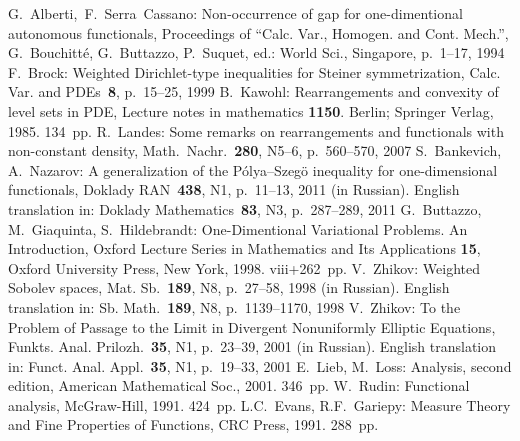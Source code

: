 \documentclass[12pt]{article}
\begin{document}
\begin{thebibliography}{99}
 G.~Alberti,~F.~Serra~Cassano: Non-occurrence of gap for one-dimentional autonomous functionals,
Proceedings of ``Calc. Var., Homogen. and Cont. Mech.'', G.~Bouchitt\'e, G.~Buttazzo, P.~Suquet, ed.: World Sci., Singapore, p.~1--17, 1994
 F.~Brock: Weighted Dirichlet-type inequalities for Steiner symmetrization,
Calc. Var. and PDEs~{\bf8}, p.~15--25, 1999
 B.~Kawohl: Rearrangements and convexity of level sets in PDE,
Lecture notes in mathematics {\bf1150}. Berlin; Springer Verlag, 1985. 134~pp.
 R.~Landes: Some remarks on rearrangements and functionals with non-constant density,
Math.~Nachr.~{\bf280}, N5--6, p.~560--570, 2007
 S.~Bankevich, A.~Nazarov: A generalization of the P\'olya--Szeg\"o inequality for one-dimensional functionals,
Doklady RAN~{\bf438}, N1, p.~11--13, 2011 (in Russian).
English translation in:
Doklady Mathematics~{\bf83}, N3, p.~287--289, 2011
 G.~Buttazzo, M.~Giaquinta, S.~Hildebrandt: One-Dimentional Variational Problems. An Introduction,
Oxford Lecture Series in Mathematics and Its Applications {\bf15},
Oxford University Press, New York, 1998. viii+262~pp.
 V.~Zhikov: Weighted Sobolev spaces,
Mat. Sb.~{\bf189}, N8, p.~27--58, 1998 (in Russian).
English translation in:
Sb. Math.~{\bf189}, N8, p.~1139--1170, 1998
 V.~Zhikov: To the Problem of Passage to the Limit in Divergent Nonuniformly Elliptic Equations,
Funkts. Anal. Prilozh.~{\bf35}, N1, p.~23--39, 2001 (in Russian).
English translation in:
Funct. Anal. Appl.~{\bf35}, N1, p.~19--33, 2001
 E.~Lieb, M.~Loss: Analysis, second edition,
American Mathematical Soc., 2001. 346~pp.
 W.~Rudin: Functional analysis,
McGraw-Hill, 1991. 424~pp.
 L.C.~Evans, R.F.~Gariepy: Measure Theory and Fine Properties of Functions,
CRC Press, 1991. 288~pp.

\end{thebibliography}
\end{document}
